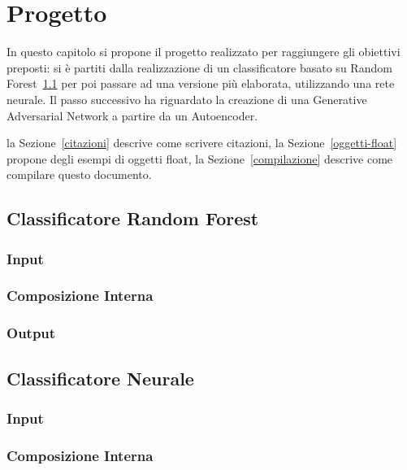 \chapter{Progetto}
\label{progetto}

In questo capitolo si propone il progetto realizzato per raggiungere gli obiettivi preposti: si è partiti dalla realizzazione di un classificatore basato su Random Forest~\ref{randomforest} per poi passare ad una versione più elaborata, utilizzando una rete neurale. Il passo successivo ha riguardato la creazione di una Generative Adversarial Network a partire da un Autoencoder.  

la Sezione~\ref{citazioni} descrive come scrivere citazioni, la Sezione~\ref{oggetti-float} propone degli esempi di oggetti float, la Sezione~\ref{compilazione} descrive come compilare questo documento.


\section{Classificatore Random Forest}
\label{randomforest}

\subsection{Input}
\label{randomforestinput}

\subsection{Composizione Interna}
\label{randomforestinterno}

\subsection{Output}
\label{randomforestoutput}

\section{Classificatore Neurale}
\label{classificatorenn}

\subsection{Input}
\label{classificatorenninput}

\subsection{Composizione Interna}
\label{classificatorenninterno}

